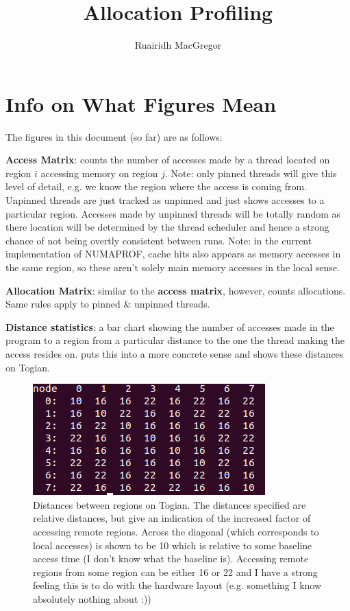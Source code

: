 \documentclass[a4paper,11pt]{article}
\title{Allocation Profiling}
\author{Ruairidh MacGregor}
\date{}
\begin{document}
\maketitle

\section{Info on What Figures Mean}

The figures in this document (so far) are as follows:

\begin{description}
\item \textbf{Access Matrix}: counts the number of accesses made by a thread located on region $i$ accessing memory on region $j$. Note: only pinned threads will give this level of detail, e.g. we know the region where the access is coming from. Unpinned threads are just tracked as unpinned and just shows accesses to a particular region. Accesses made by unpinned threads will be totally random as there location will be determined by the thread scheduler and hence a strong chance of not being overtly consistent between runs. Note: in the current implementation of NUMAPROF, cache hits also appears as memory accesses in the same region, so these aren't solely main memory accesses in the local sense.
\item \textbf{Allocation Matrix}: similar to the \textbf{access matrix}, however, counts allocations. Same rules apply to pinned \& unpinned threads.
\item \textbf{Distance statistics}: a bar chart showing the number of accesses made in the program to a region from a particular distance to the one the thread making the access resides on.  puts this into a more concrete sense and shows these distances on Togian.
\end{description}

\begin{figure}[!htb]
    \centering
    \includegraphics[width=\linewidth]{TechMemo/results/misc/distances.png}
    \caption{Distances between regions on Togian. The distances specified are relative distances, but give an indication of the increased factor of accessing remote regions. Across the diagonal (which corresponds to local accesses) is shown to be 10 which is relative to some baseline access time (I don't know what the baseline is). Accessing remote regions from some region can be either 16 or 22 and I have a strong feeling this is to do with the hardware layout (e.g. something I know absolutely nothing about :)) }
    \label{fig:distance}
\end{figure}
\end{document}
